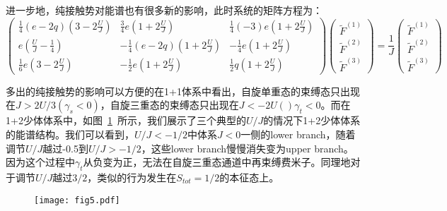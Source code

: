 进一步地，纯接触势对能谱也有很多新的影响，此时系统的矩阵方程为：
\begin{equation}
\left(\begin{array}{ccc}
\frac{1}{4}(e-2 q)\left(3-2 \frac{U}{J}\right) & \frac{3}{4} e\left(1+2 \frac{U}{J}\right) & \frac{1}{4}(-3) e\left(1+2 \frac{U}{J}\right) \\
e\left(\frac{U}{J}-\frac{1}{4}\right) & -\frac{1}{4}(e-2 q)\left(1+2 \frac{U}{J}\right) & -\frac{1}{4} e\left(1+2 \frac{U}{J}\right) \\
\frac{1}{6} e\left(3-2 \frac{U}{J}\right) & -\frac{1}{2} e\left(1+2 \frac{U}{J}\right) & \frac{1}{2} q\left(1+2 \frac{U}{J}\right)
\end{array}\right)\left(\begin{array}{l}
\tilde{F}^{(1)} \\
\tilde{F}^{(2)} \\
\tilde{F}^{(3)}
\end{array}\right)=\frac{1}{J}\left(\begin{array}{l}
\tilde{F}^{(1)} \\
\tilde{F}^{(2)} \\
\tilde{F}^{(3)}
\end{array}\right)
\end{equation}

多出的纯接触势的影响可以方便的在1+1体系中看出，自旋单重态的束缚态只出现在$J>2U/3(\gamma_s<0)$，自旋三重态的束缚态只出现在$J<-2U()\gamma_t<0$。而在1+2少体体系中，如图~\ref{fig5}~所示，我们展示了三个典型的$U/J$的情况下1+2少体体系的能谱结构。我们可以看到，$U/J<-1/2$中体系$J<0$一侧的lower branch，随着调节$U/J$越过-0.5到$U/J>-1/2$，这些lower branch慢慢消失变为upper branch。因为这个过程中$\gamma_t$从负变为正，无法在自旋三重态通道中再束缚费米子。同理地对于调节$U/J$越过$3/2$，类似的行为发生在$S_{tot}=1/2$的本征态上。


\begin{figure}[!htbp]
    \centering
    \texttt{[image: fig5.pdf]}
    \label{fig5}
\end{figure}

